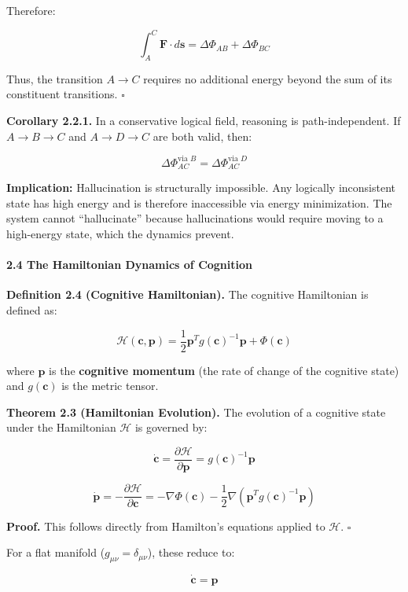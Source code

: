 \documentclass[
  11pt,
  a4paper,
]{article}
\begin{document}
Therefore:

\[\int_A^C \mathbf{F} \cdot d\mathbf{s} = \Delta \Phi_{AB} + \Delta \Phi_{BC}\]

Thus, the transition \(A \to C\) requires no additional energy beyond
the sum of its constituent transitions. \(\square\)

\textbf{Corollary 2.2.1.} In a conservative logical field, reasoning is
path-independent. If \(A \to B \to C\) and \(A \to D \to C\) are both
valid, then:

\[\Delta \Phi_{AC}^{\text{via }B} = \Delta \Phi_{AC}^{\text{via }D}\]

\textbf{Implication:} Hallucination is structurally impossible. Any
logically inconsistent state has high energy and is therefore
inaccessible via energy minimization. The system cannot ``hallucinate''
because hallucinations would require moving to a high-energy state,
which the dynamics prevent.

\paragraph{2.4 The Hamiltonian Dynamics of
Cognition}\label{the-hamiltonian-dynamics-of-cognition}

\textbf{Definition 2.4 (Cognitive Hamiltonian).} The cognitive
Hamiltonian is defined as:

\[\mathcal{H}(\mathbf{c}, \mathbf{p}) = \frac{1}{2} \mathbf{p}^T g(\mathbf{c})^{-1} \mathbf{p} + \Phi(\mathbf{c})\]

where \(\mathbf{p}\) is the \textbf{cognitive momentum} (the rate of
change of the cognitive state) and \(g(\mathbf{c})\) is the metric
tensor.

\textbf{Theorem 2.3 (Hamiltonian Evolution).} The evolution of a
cognitive state under the Hamiltonian \(\mathcal{H}\) is governed by:

\[\dot{\mathbf{c}} = \frac{\partial \mathcal{H}}{\partial \mathbf{p}} = g(\mathbf{c})^{-1} \mathbf{p}\]

\[\dot{\mathbf{p}} = -\frac{\partial \mathcal{H}}{\partial \mathbf{c}} = -\nabla \Phi(\mathbf{c}) - \frac{1}{2} \nabla \left( \mathbf{p}^T g(\mathbf{c})^{-1} \mathbf{p} \right)\]

\textbf{Proof.} This follows directly from Hamilton's equations applied
to \(\mathcal{H}\). \(\square\)

For a flat manifold (\(g_{\mu\nu} = \delta_{\mu\nu}\)), these reduce to:

\[\dot{\mathbf{c}} = \mathbf{p}\]
\end{document}
